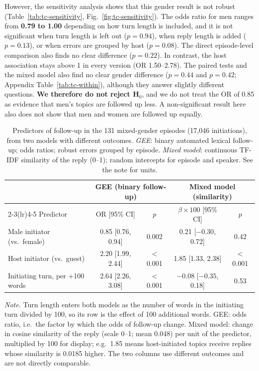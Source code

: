 However, the sensitivity analysis shows that this gender result is not robust (Table~\ref{tab:tc-sensitivity}, Fig.~\ref{fig:tc-sensitivity}). The odds ratio for men ranges from \textbf{0.79 to 1.00} depending on how turn length is included, and it is not significant when turn length is left out ($p = 0.94$), when reply length is added ($p = 0.13$), or when errors are grouped by host ($p = 0.08$). The direct episode-level comparison also finds no clear difference ($p = 0.22$). In contrast, the host association stays above 1 in every version (OR 1.50--2.78). The paired tests and the mixed model also find no clear gender difference ($p = 0.44$ and $p = 0.42$; Appendix Table~\ref{tab:tc-within}), although they answer slightly different questions. \textbf{We therefore do not reject H$_0$}, and we do not treat the OR of 0.85 as evidence that men's topics are followed up less. A non-significant result here also does not show that men and women are followed up equally.

\begin{table}[H]
\centering
\caption{Predictors of follow-up in the 131 mixed-gender episodes (17,046 initiations), from two models with different outcomes. \emph{GEE}: binary automated lexical follow-up; odds ratios; robust errors grouped by episode. \emph{Mixed model}: continuous TF-IDF similarity of the reply (0--1); random intercepts for episode and speaker. See the note for units.}
\label{tab:tc-models}
\begin{tabular}{lcccc}
\toprule
 & \multicolumn{2}{c}{GEE (binary follow-up)} & \multicolumn{2}{c}{Mixed model (similarity)} \\
\cmidrule(lr){2-3}\cmidrule(lr){4-5}
Predictor & OR [95\% CI] & $p$ & $\beta \times 100$ [95\% CI] & $p$ \\
\midrule
Male initiator (vs.\ female)          & 0.85 [0.76, 0.94] & 0.002    & 0.21 [$-0.30$, 0.72]    & 0.42 \\
Host initiator (vs.\ guest)           & 2.20 [1.99, 2.44] & $<$0.001 & 1.85 [1.33, 2.38]       & $<$0.001 \\
Initiating turn, per +100 words       & 2.64 [2.26, 3.08] & $<$0.001 & $-0.08$ [$-0.35$, 0.18] & 0.53 \\
\bottomrule
\end{tabular}

\vspace{3pt}
\parbox{0.95\linewidth}{\footnotesize \emph{Note.} Turn length enters both models as the number of words in the initiating turn divided by 100, so its row is the effect of 100 additional words. GEE: odds ratio, i.e.\ the factor by which the odds of follow-up change. Mixed model: change in cosine similarity of the reply (scale 0--1; mean 0.048) per unit of the predictor, multiplied by 100 for display; e.g.\ 1.85 means host-initiated topics receive replies whose similarity is 0.0185 higher. The two columns use different outcomes and are not directly comparable.}
\end{table}

